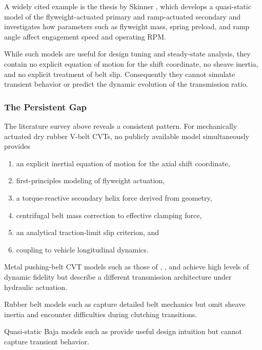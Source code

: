 \documentclass[11pt]{article}
\numberwithin{equation}{section}
\begin{document}
A widely cited example is the thesis by Skinner \cite{Skinner2020},
which develops a quasi-static model of the flyweight-actuated primary
and ramp-actuated secondary and investigates how parameters such as
flyweight mass, spring preload, and ramp angle affect engagement
speed and operating RPM.

While such models are useful for design tuning and steady-state
analysis, they contain no explicit equation of motion for the shift
coordinate, no sheave inertia, and no explicit treatment of belt
slip. Consequently they cannot simulate transient behavior or
predict the dynamic evolution of the transmission ratio.

\subsubsection{The Persistent Gap}

The literature survey above reveals a consistent pattern.
For mechanically actuated dry rubber V-belt CVTs, no publicly
available model simultaneously provides

\begin{enumerate}
\item an explicit inertial equation of motion for the axial shift coordinate,
\item first-principles modeling of flyweight actuation,
\item a torque-reactive secondary helix force derived from geometry,
\item centrifugal belt mass correction to effective clamping force,
\item an analytical traction-limit slip criterion, and
\item coupling to vehicle longitudinal dynamics.
\end{enumerate}

Metal pushing-belt CVT models such as those of
\cite{Carbone2005}, \cite{SrivastavaHaque2006}, and \cite{Bonsen2004}
achieve high levels of dynamic fidelity but describe a different
transmission architecture under hydraulic actuation.

Rubber belt models such as \cite{JulioPlante2011} capture detailed
belt mechanics but omit sheave inertia and encounter difficulties
during clutching transitions.

Quasi-static Baja models such as \cite{Skinner2020} provide useful
design intuition but cannot capture transient behavior.
\end{document}
